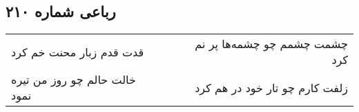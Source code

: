 \begin{center}
\section*{رباعی شماره ۲۱۰}
\label{sec:sh210}
\begin{longtable}{l p{0.5cm} r}
قدت قدم زبار محنت خم کرد
&&
چشمت چشمم چو چشمه‌ها پر نم کرد
\\
خالت حالم چو روز من تیره نمود
&&
زلفت کارم چو تار خود در هم کرد
\\
\end{longtable}
\end{center}
